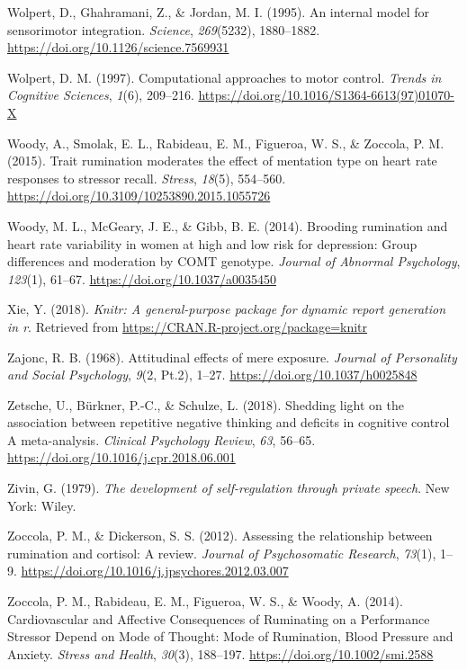 \documentclass[a4paper,12pt,twoside,openright,oldfontcommands,final]{memoir}
\begin{document}
\leavevmode\hypertarget{ref-wolpert_internal_1995}{}%
Wolpert, D., Ghahramani, Z., \& Jordan, M. I. (1995). An internal model for sensorimotor integration. \emph{Science}, \emph{269}(5232), 1880--1882. \url{https://doi.org/10.1126/science.7569931}

\leavevmode\hypertarget{ref-wolpert_computational_1997}{}%
Wolpert, D. M. (1997). Computational approaches to motor control. \emph{Trends in Cognitive Sciences}, \emph{1}(6), 209--216. \url{https://doi.org/10.1016/S1364-6613(97)01070-X}

\leavevmode\hypertarget{ref-woody_trait_2015}{}%
Woody, A., Smolak, E. L., Rabideau, E. M., Figueroa, W. S., \& Zoccola, P. M. (2015). Trait rumination moderates the effect of mentation type on heart rate responses to stressor recall. \emph{Stress}, \emph{18}(5), 554--560. \url{https://doi.org/10.3109/10253890.2015.1055726}

\leavevmode\hypertarget{ref-woody_brooding_2014}{}%
Woody, M. L., McGeary, J. E., \& Gibb, B. E. (2014). Brooding rumination and heart rate variability in women at high and low risk for depression: Group differences and moderation by COMT genotype. \emph{Journal of Abnormal Psychology}, \emph{123}(1), 61--67. \url{https://doi.org/10.1037/a0035450}

\leavevmode\hypertarget{ref-R-knitr}{}%
Xie, Y. (2018). \emph{Knitr: A general-purpose package for dynamic report generation in r}. Retrieved from \url{https://CRAN.R-project.org/package=knitr}

\leavevmode\hypertarget{ref-zajonc_attitudinal_1968}{}%
Zajonc, R. B. (1968). Attitudinal effects of mere exposure. \emph{Journal of Personality and Social Psychology}, \emph{9}(2, Pt.2), 1--27. \url{https://doi.org/10.1037/h0025848}

\leavevmode\hypertarget{ref-zetsche_shedding_2018}{}%
Zetsche, U., Bürkner, P.-C., \& Schulze, L. (2018). Shedding light on the association between repetitive negative thinking and deficits in cognitive control A meta-analysis. \emph{Clinical Psychology Review}, \emph{63}, 56--65. \url{https://doi.org/10.1016/j.cpr.2018.06.001}

\leavevmode\hypertarget{ref-zivin_development_1979}{}%
Zivin, G. (1979). \emph{The development of self-regulation through private speech}. New York: Wiley.

\leavevmode\hypertarget{ref-zoccola_assessing_2012}{}%
Zoccola, P. M., \& Dickerson, S. S. (2012). Assessing the relationship between rumination and cortisol: A review. \emph{Journal of Psychosomatic Research}, \emph{73}(1), 1--9. \url{https://doi.org/10.1016/j.jpsychores.2012.03.007}

\leavevmode\hypertarget{ref-zoccola_cardiovascular_2014}{}%
Zoccola, P. M., Rabideau, E. M., Figueroa, W. S., \& Woody, A. (2014). Cardiovascular and Affective Consequences of Ruminating on a Performance Stressor Depend on Mode of Thought: Mode of Rumination, Blood Pressure and Anxiety. \emph{Stress and Health}, \emph{30}(3), 188--197. \url{https://doi.org/10.1002/smi.2588}
\end{document}
